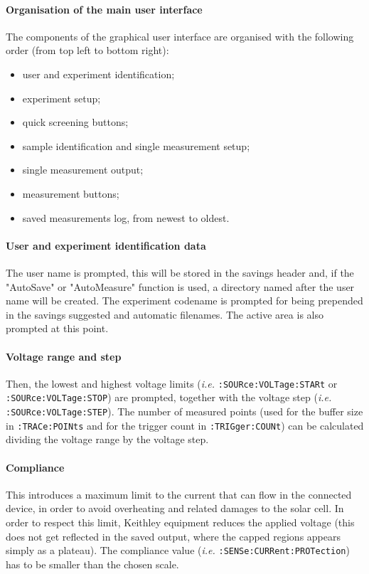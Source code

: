 		\paragraph{Organisation of the main user interface}
		The components of the graphical user interface are organised with the following order (from top left to bottom right):
		\begin{itemize}
			\item user and experiment identification;
			\item experiment setup;
			\item quick screening buttons;
			\item sample identification and single measurement setup;
			\item single measurement output;
			\item measurement buttons;
			\item saved measurements log, from newest to oldest.
		\end{itemize}
		
		
		\paragraph{User and experiment identification data}
		The user name is prompted, this will be stored in the savings header and, if the "AutoSave" or "AutoMeasure" function is used, a directory named after the user name will be created.
		The experiment codename is prompted for being prepended in the savings suggested and automatic filenames.
		The active area is also prompted at this point.

		\paragraph{Voltage range and step}
		Then, the lowest and highest voltage limits (\textsl{i.e.} \texttt{:SOURce:\-VOLTage:\-STARt} or \texttt{:SOURce:\-VOLTage:\-STOP}) are prompted, together with the voltage step (\textsl{i.e.} \texttt{:SOURce:\-VOLTage:\-STEP}).
		The number of measured points (used for the buffer size in \texttt{:TRACe:\-POINts} and for the trigger count in \texttt{:TRIGger:\-COUNt}) can be calculated dividing the voltage range by the voltage step.
		
		\paragraph{Compliance}
		This introduces a maximum limit to the current that can flow in the connected device, in order to avoid overheating and related damages to the solar cell.
		In order to respect this limit, Keithley equipment reduces the applied voltage (this does not get reflected in the saved output, where the capped regions appears simply as a plateau).
		The compliance value (\textsl{i.e.} \texttt{:SENSe:\-CURRent:\-PROTection}) has to be smaller than the chosen scale.
		

